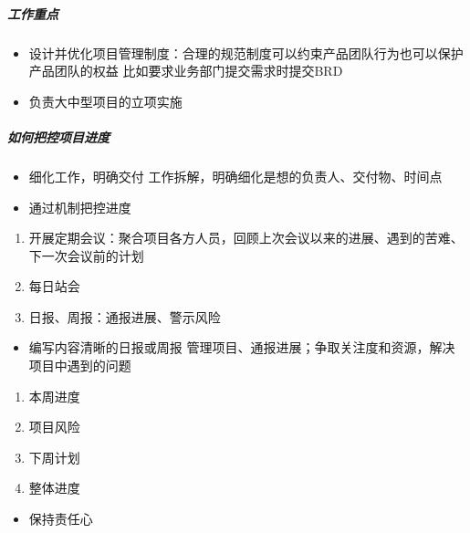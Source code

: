 \documentclass[letterpaper,11pt,english]{sphinxmanual}
\begin{document}
\subparagraph{工作重点}
\label{\detokenize{chapter_introduction/2B:id21}}\begin{itemize}
\item {} 
设计并优化项目管理制度：合理的规范制度可以约束产品团队行为也可以保护产品团队的权益
比如要求业务部门提交需求时提交BRD

\item {} 
负责大中型项目的立项实施

\end{itemize}


\subparagraph{如何把控项目进度}
\label{\detokenize{chapter_introduction/2B:id22}}\begin{itemize}
\item {} 
细化工作，明确交付 工作拆解，明确细化是想的负责人、交付物、时间点

\item {} 
通过机制把控进度

\end{itemize}
\begin{enumerate}
%
\item {} 
开展定期会议：聚合项目各方人员，回顾上次会议以来的进展、遇到的苦难、下一次会议前的计划

\item {} 
每日站会

\item {} 
日报、周报：通报进展、警示风险

\end{enumerate}
\begin{itemize}
\item {} 
编写内容清晰的日报或周报
管理项目、通报进展；争取关注度和资源，解决项目中遇到的问题

\end{itemize}
\begin{enumerate}
%
\item {} 
本周进度

\item {} 
项目风险

\item {} 
下周计划

\item {} 
整体进度

\end{enumerate}
\begin{itemize}
\item {} 
保持责任心

\end{itemize}
\end{document}
